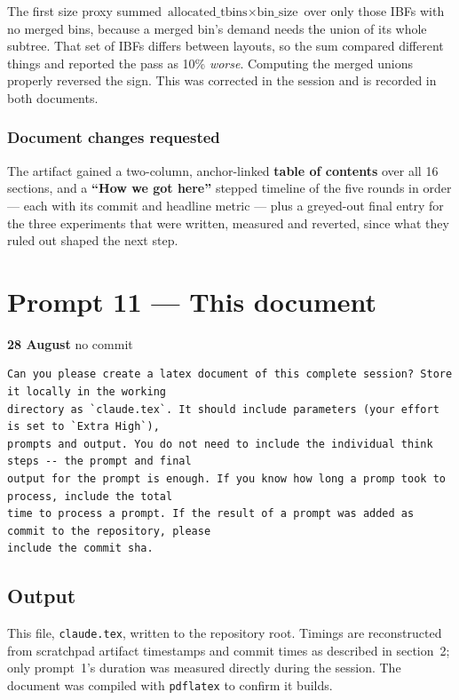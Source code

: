 \documentclass[11pt,a4paper]{article}
\newenvironment{promptbox}{\medskip}{\medskip}
\begin{document}
The first size proxy summed $\text{allocated\_tbins} \times \text{bin\_size}$ over only those IBFs
with no merged bins, because a merged bin's demand needs the union of its whole subtree. That set of
IBFs differs between layouts, so the sum compared different things and reported the pass as 10\%
\emph{worse}. Computing the merged unions properly reversed the sign. This was corrected in the
session and is recorded in both documents.

\subsubsection*{Document changes requested}

The artifact gained a two-column, anchor-linked \textbf{table of contents} over all 16 sections, and
a \textbf{``How we got here''} stepped timeline of the five rounds in order --- each with its commit
and headline metric --- plus a greyed-out final entry for the three experiments that were written,
measured and reverted, since what they ruled out shaped the next step.

\section{Prompt 11 --- This document}
\textbf{28 August} \textperiodcentered{} no commit
\begin{promptbox}
\begin{lstlisting}[style=promptstyle]
Can you please create a latex document of this complete session? Store it locally in the working
directory as `claude.tex`. It should include parameters (your effort is set to `Extra High`),
prompts and output. You do not need to include the individual think steps -- the prompt and final
output for the prompt is enough. If you know how long a promp took to process, include the total
time to process a prompt. If the result of a prompt was added as commit to the repository, please
include the commit sha.
\end{lstlisting}
\end{promptbox}
\subsection*{Output}

This file, \texttt{claude.tex}, written to the repository root. Timings are reconstructed from
scratchpad artifact timestamps and commit times as described in section~2; only prompt~1's duration
was measured directly during the session. The document was compiled with \texttt{pdflatex} to
confirm it builds.
\end{document}
